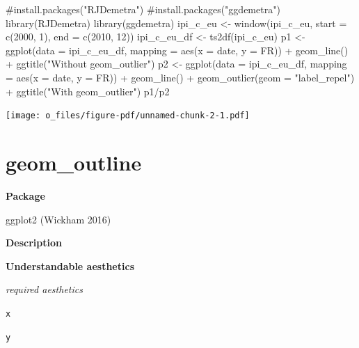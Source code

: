 \documentclass[
  letterpaper,
  DIV=11,
  numbers=noendperiod]{scrreprt}
\newenvironment{Shaded}{\begin{snugshade}}{\end{snugshade}}
\newcommand{\AttributeTok}[1]{\textcolor[rgb]{0.40,0.45,0.13}{#1}}
\newcommand{\CommentTok}[1]{\textcolor[rgb]{0.37,0.37,0.37}{#1}}
\newcommand{\DecValTok}[1]{\textcolor[rgb]{0.68,0.00,0.00}{#1}}
\newcommand{\FunctionTok}[1]{\textcolor[rgb]{0.28,0.35,0.67}{#1}}
\newcommand{\NormalTok}[1]{\textcolor[rgb]{0.00,0.23,0.31}{#1}}
\newcommand{\OtherTok}[1]{\textcolor[rgb]{0.00,0.23,0.31}{#1}}
\newcommand{\SpecialCharTok}[1]{\textcolor[rgb]{0.37,0.37,0.37}{#1}}
\newcommand{\StringTok}[1]{\textcolor[rgb]{0.13,0.47,0.30}{#1}}
\begin{document}
\begin{Shaded}
\begin{Highlighting}[]
\CommentTok{\#install.packages("RJDemetra")}
\CommentTok{\#install.packages("ggdemetra")}
\FunctionTok{library}\NormalTok{(RJDemetra)}
\FunctionTok{library}\NormalTok{(ggdemetra)}
\NormalTok{ipi\_c\_eu }\OtherTok{\textless{}{-}} \FunctionTok{window}\NormalTok{(ipi\_c\_eu, }\AttributeTok{start =} \FunctionTok{c}\NormalTok{(}\DecValTok{2000}\NormalTok{, }\DecValTok{1}\NormalTok{), }\AttributeTok{end =} \FunctionTok{c}\NormalTok{(}\DecValTok{2010}\NormalTok{, }\DecValTok{12}\NormalTok{))}
\NormalTok{ipi\_c\_eu\_df }\OtherTok{\textless{}{-}} \FunctionTok{ts2df}\NormalTok{(ipi\_c\_eu)}
\NormalTok{p1 }\OtherTok{\textless{}{-}} \FunctionTok{ggplot}\NormalTok{(}\AttributeTok{data =}\NormalTok{ ipi\_c\_eu\_df, }\AttributeTok{mapping =} \FunctionTok{aes}\NormalTok{(}\AttributeTok{x =}\NormalTok{ date, }\AttributeTok{y =}\NormalTok{ FR)) }\SpecialCharTok{+}
    \FunctionTok{geom\_line}\NormalTok{() }\SpecialCharTok{+} \FunctionTok{ggtitle}\NormalTok{(}\StringTok{"Without geom\_outlier"}\NormalTok{)}
\NormalTok{p2 }\OtherTok{\textless{}{-}} \FunctionTok{ggplot}\NormalTok{(}\AttributeTok{data =}\NormalTok{ ipi\_c\_eu\_df, }\AttributeTok{mapping =} \FunctionTok{aes}\NormalTok{(}\AttributeTok{x =}\NormalTok{ date, }\AttributeTok{y =}\NormalTok{ FR)) }\SpecialCharTok{+}
    \FunctionTok{geom\_line}\NormalTok{() }\SpecialCharTok{+} \FunctionTok{geom\_outlier}\NormalTok{(}\AttributeTok{geom =} \StringTok{"label\_repel"}\NormalTok{) }\SpecialCharTok{+} \FunctionTok{ggtitle}\NormalTok{(}\StringTok{"With geom\_outlier"}\NormalTok{)}
\NormalTok{p1}\SpecialCharTok{/}\NormalTok{p2}
\end{Highlighting}
\end{Shaded}

\texttt{[image: o\_files/figure-pdf/unnamed-chunk-2-1.pdf]}

\section{geom\_outline}\label{outline}

\textbf{Package}

ggplot2 (Wickham 2016)

\textbf{Description}

\textbf{Understandable aesthetics}

\emph{required aesthetics}

\texttt{x}

\texttt{y}
\end{document}
